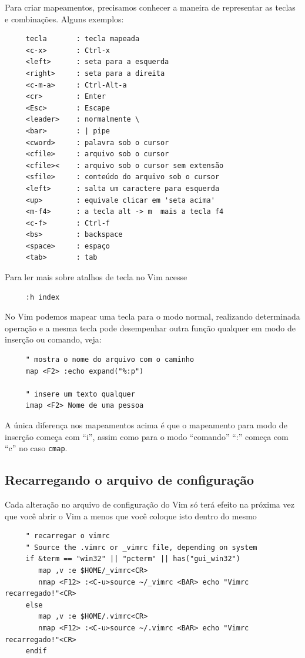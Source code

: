 \documentclass[10pt,a4paper,openany]{book}
\begin{document}
Para criar mapeamentos, precisamos conhecer a maneira de representar
as teclas e combinações. Alguns exemplos:

\begin{verbatim}
     tecla       : tecla mapeada
     <c-x>       : Ctrl-x
     <left>      : seta para a esquerda
     <right>     : seta para a direita
     <c-m-a>     : Ctrl-Alt-a
     <cr>        : Enter
     <Esc>       : Escape
     <leader>    : normalmente \
     <bar>       : | pipe
     <cword>     : palavra sob o cursor
     <cfile>     : arquivo sob o cursor
     <cfile><    : arquivo sob o cursor sem extensão
     <sfile>     : conteúdo do arquivo sob o cursor
     <left>      : salta um caractere para esquerda
     <up>        : equivale clicar em 'seta acima'
     <m-f4>      : a tecla alt -> m  mais a tecla f4
     <c-f>       : Ctrl-f
     <bs>        : backspace
     <space>     : espaço
     <tab>       : tab
\end{verbatim}

Para ler mais sobre atalhos de tecla no Vim acesse 

\begin{verbatim}
     :h index
\end{verbatim}

No Vim podemos mapear uma tecla para o modo normal, realizando
determinada operação e a mesma tecla pode desempenhar outra função
qualquer em modo de inserção ou comando, veja:

\begin{verbatim}
     " mostra o nome do arquivo com o caminho
     map <F2> :echo expand("%:p")
     
     " insere um texto qualquer
     imap <F2> Nome de uma pessoa
\end{verbatim}

A única diferença nos mapeamentos acima é que o mapeamento para modo
de inserção começa com ``i'', assim como para o modo ``comando'' ``:'' começa
com ``c'' no caso \verb|cmap|.

\subsection{Recarregando o arquivo de configuração}
\label{sec:Recarregando o arquivo de configuração}

Cada alteração no arquivo de configuração do Vim só terá efeito na próxima vez que você
abrir o Vim a menos que você coloque isto dentro do mesmo

\begin{verbatim}
     " recarregar o vimrc
     " Source the .vimrc or _vimrc file, depending on system
     if &term == "win32" || "pcterm" || has("gui_win32")
        map ,v :e $HOME/_vimrc<CR>
        nmap <F12> :<C-u>source ~/_vimrc <BAR> echo "Vimrc recarregado!"<CR>
     else
        map ,v :e $HOME/.vimrc<CR>
        nmap <F12> :<C-u>source ~/.vimrc <BAR> echo "Vimrc recarregado!"<CR>
     endif
\end{verbatim}
\end{document}
